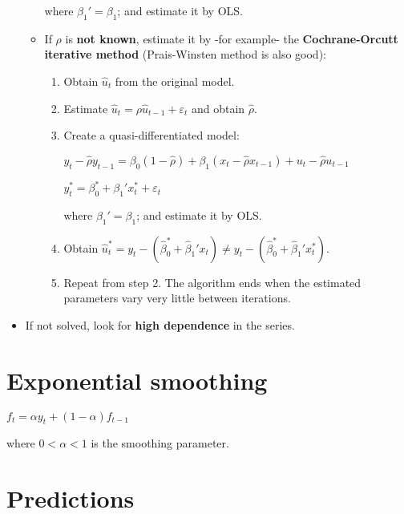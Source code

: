 \documentclass[10pt, a4paper, landscape]{article}
\begin{document}
\begin{multicols}{3}
\begin{itemize}[leftmargin=*]
\begin{itemize}[leftmargin=*]
				where $\beta_{1}' = \beta_{1}$; and estimate it by OLS.
				
				\item If $\rho$ is \textbf{not known}, estimate it by -for example- the \textbf{Cochrane-Orcutt iterative method} (Prais-Winsten method is also good):
				
				\begin{enumerate}[leftmargin=*]
					\item Obtain $\hat{u}_{t}$ from the original model.
					\item Estimate $\hat{u}_{t} = \rho \hat{u}_{t-1} + \varepsilon_{t}$ and obtain $\hat{\rho}$.
					\item Create a quasi-differentiated model:
					
					\begin{center}
						$y_{t} - \hat{\rho}y_{t - 1} = \beta_{0} (1 - \hat{\rho}) + \beta_{1} (x_{t} - \hat{\rho} x_{t - 1}) + u_{t} - \hat{\rho}u_{t - 1}$
						
						$y_{t}^{*} = \beta_{0}^{*} + \beta_{1}' x_{t}^{*} + \varepsilon_{t}$
					\end{center}
					
					where $\beta_{1}' = \beta_{1}$; and estimate it by OLS.
					
					\item Obtain $\hat{u}_{t}^{*} = y_{t} - (\hat{\beta}_{0}^{*} + \hat{\beta}_{1}' x_{t}) \neq y_{t} - (\hat{\beta}_{0}^{*} + \hat{\beta}_{1}' x_{t}^{*})$.
					\item Repeat from step 2. The algorithm ends when the estimated parameters vary very little between iterations.
				\end{enumerate}
			\end{itemize}
			
			\item If not solved, look for \textbf{high dependence} in the series.
		\end{itemize}
		
		\section*{Exponential smoothing}
		
		\begin{center}
			$f_{t} = \alpha y_{t} + (1 - \alpha) f_{t - 1}$
		\end{center}
		
		where $0 < \alpha < 1$ is the smoothing parameter.
		
		\section*{Predictions}
		

\end{multicols}
\end{document}
